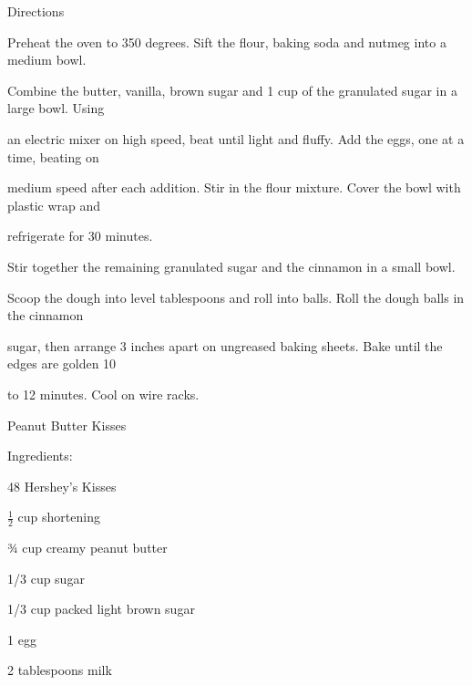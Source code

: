 \documentclass[a4paper,portrait,12pt]{book}
\begin{document}
Directions




Preheat the oven to 350 degrees. Sift the flour, baking soda and nutmeg into a medium bowl.




Combine the butter, vanilla, brown sugar and 1 cup of the granulated sugar in a large bowl. Using




an electric mixer on high speed, beat until light and fluffy. Add the eggs, one at a time, beating on




medium speed after each addition. Stir in the flour mixture. Cover the bowl with plastic wrap and




refrigerate for 30 minutes.




Stir together the remaining granulated sugar and the cinnamon in a small bowl.




Scoop the dough into level tablespoons and roll into balls. Roll the dough balls in the cinnamon




sugar, then arrange 3 inches apart on ungreased baking sheets. Bake until the edges are golden 10




to 12 minutes. Cool on wire racks.







\newpage
Peanut Butter Kisses




Ingredients:




48 Hershey's Kisses




$\frac{1}{2}$ cup shortening




¾ cup creamy peanut butter




1/3 cup sugar




1/3 cup packed light brown sugar




1 egg




2 tablespoons milk
\end{document}
